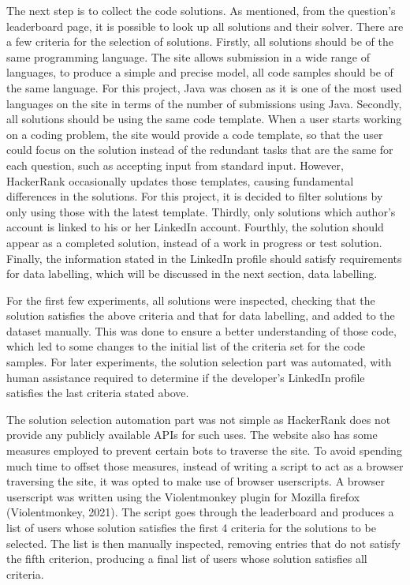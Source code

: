 \documentclass{report}
\begin{document}
The next step is to collect the code solutions. As mentioned, from the question’s leaderboard page, it is possible to look up all solutions and their solver. There are a few criteria for the selection of solutions. Firstly, all solutions should be of the same programming language. The site allows submission in a wide range of languages, to produce a simple and precise model, all code samples should be of the same language. For this project, Java was chosen as it is one of the most used languages on the site in terms of the number of submissions using Java. Secondly, all solutions should be using the same code template. When a user starts working on a coding problem, the site would provide a code template, so that the user could focus on the solution instead of the redundant tasks that are the same for each question, such as accepting input from standard input. However, HackerRank occasionally updates those templates, causing fundamental differences in the solutions. For this project, it is decided to filter solutions by only using those with the latest template. Thirdly, only solutions which author’s account is linked to his or her LinkedIn account. Fourthly, the solution should appear as a completed solution, instead of a work in progress or test solution. Finally, the information stated in the LinkedIn profile should satisfy requirements for data labelling, which will be discussed in the next section, data labelling.

For the first few experiments, all solutions were inspected, checking that the solution satisfies the above criteria and that for data labelling, and added to the dataset manually. This was done to ensure a better understanding of those code, which led to some changes to the initial list of the criteria set for the code samples. For later experiments, the solution selection part was automated, with human assistance required to determine if the developer’s LinkedIn profile satisfies the last criteria stated above.

The solution selection automation part was not simple as HackerRank does not provide any publicly available APIs for such uses. The website also has some measures employed to prevent certain bots to traverse the site. To avoid spending much time to offset those measures, instead of writing a script to act as a browser traversing the site, it was opted to make use of browser userscripts. A browser userscript was written using the Violentmonkey plugin for Mozilla firefox (Violentmonkey, 2021). The script goes through the leaderboard and produces a list of users whose solution satisfies the first 4 criteria for the solutions to be selected. The list is then manually inspected, removing entries that do not satisfy the fifth criterion, producing a final list of users whose solution satisfies all criteria.
\end{document}

